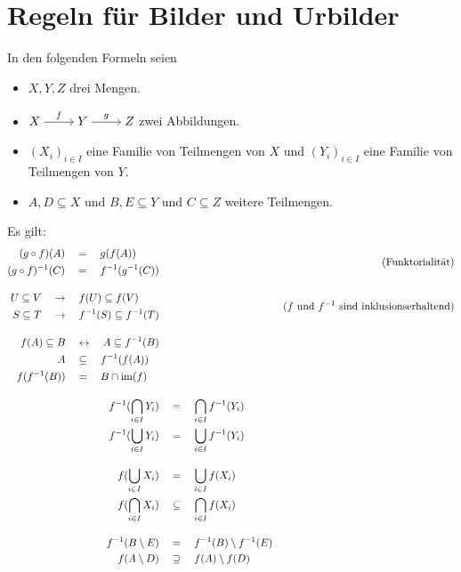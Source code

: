 \section{Regeln für Bilder und Urbilder}
In den folgenden Formeln seien
\begin{itemize}
    \item $X,Y,Z$ drei Mengen.
    \item $\begin{tikzcd}[cramped] X \ar[r, "f"] &  Y\ar[r, "g"] & Z \end{tikzcd}$ zwei Abbildungen.
    \item $(X_i)_{i\in I}$ eine Familie von Teilmengen von $X$ und $(Y_i)_{i\in I}$ eine Familie von Teilmengen von $Y$.
    \item $A,D\subseteq X$ und $B,E\subseteq Y$ und $C\subseteq Z$ weitere Teilmengen.
\end{itemize}
Es gilt:
\begingroup
\allowdisplaybreaks
\begin{align*}
    \begin{split}
    (g\circ f)(A) & \quad=\quad g(f(A)) \\
    (g\circ f)^{-1}(C) & \quad=\quad f^{-1}(g^{-1}(C))
    \end{split} && (\text{Funktorialität}) \\[1em]
    \begin{split}
        U\subseteq V & \quad \to\quad f(U) \subseteq f(V) \\
        S\subseteq T & \quad \to\quad f^{-1}(S)\subseteq f^{-1}(T)
    \end{split} && (\text{$f$ und $f^{-1}$ sind inklusionserhaltend}) \\[1em]
    \begin{split}
        f(A) \subseteq B & \quad \leftrightarrow\quad A \subseteq f^{-1}(B) \\
        A & \quad \subseteq\quad f^{-1}(f(A)) \\
        f(f^{-1}(B)) & \quad=\quad B\cap \operatorname{im}(f)
    \end{split} \\[1em]
    f^{-1}(\bigcap_{i \in I} Y_i) & \quad=\quad \bigcap_{i \in I} f^{-1}(Y_i) \\
    f^{-1} (\bigcup_{i \in I} Y_i) & \quad=\quad \bigcup_{i \in I} f^{-1}(Y_i) \\[1em]
    f(\bigcup_{i \in I} X_i) & \quad=\quad \bigcup_{i \in I} f(X_i) \\
    f(\bigcap_{i \in I} X_i) & \quad \subseteq\quad \bigcap_{i \in I} f(X_i) \\[1em]
    f^{-1}(B\setminus E) & \quad=\quad f^{-1}(B)\setminus f^{-1}(E) \\
    f(A\setminus D) & \quad \supseteq\quad f(A)\setminus f(D)
\end{align*}
\endgroup




